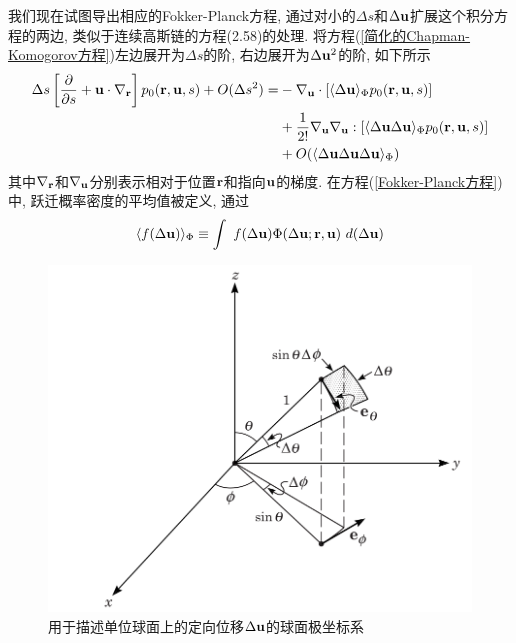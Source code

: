 我们现在试图导出相应的Fokker-Planck方程, 通过对小的$\Delta s$和$\Delta \mathbf{u}$扩展这个积分方程的两边, 类似于连续高斯链的方程(2.58)的处理. 将方程(\ref{简化的Chapman-Komogorov方程})左边展开为$\Delta s$的阶, 右边展开为$\Delta \mathbf{u}^2$的阶, 如下所示\\
\begin{equation}
\begin{aligned}
	\Delta s \left[\frac{\partial}{\partial s}+\mathbf{u}\cdot\nabla_{\mathbf{r}}\right]p_0(\mathbf{r},\mathbf{u},s)+O(\Delta s^2)=&-\nabla_{\mathbf{u}} \cdot [\langle \Delta \mathbf{u}\rangle_\Phi p_0(\mathbf{r},\mathbf{u},s)]\\&+\frac{1}{2!}\nabla_{\mathbf{u}} \nabla_{\mathbf{u}} :[\langle\Delta \mathbf{u}\Delta \mathbf{u} \rangle_\Phi p_0(\mathbf{r},\mathbf{u},s)]\\&+O(\langle \Delta \mathbf{u} \Delta \mathbf{u}\Delta \mathbf{u}\rangle_\Phi) \label{Fokker-Planck方程}
\end{aligned}
\end{equation}
其中$\nabla_{\mathbf{r}}$和$\nabla_{\mathbf{u}}$分别表示相对于位置$\mathbf{r}$和指向$\mathbf{u}$的梯度. 在方程(\ref{Fokker-Planck方程})中, 跃迁概率密度的平均值被定义, 通过
\begin{equation}
\langle f(\Delta \mathbf{u})\rangle _\Phi\equiv\int \ f(\Delta \mathbf{u} )\Phi(\Delta \mathbf{u};\mathbf{r},\mathbf{u})\ d(\Delta \mathbf{u})
\end{equation}
\begin{figure}[H]
	\centering   
	\includegraphics[width=12cm]{Contents/chapter2/figures/7.png}
	\caption{用于描述单位球面上的定向位移$\Delta \mathbf{u}$的球面极坐标系}
	\label{用于描述单位球面上的定向位移的球面极坐标系}
\end{figure}

